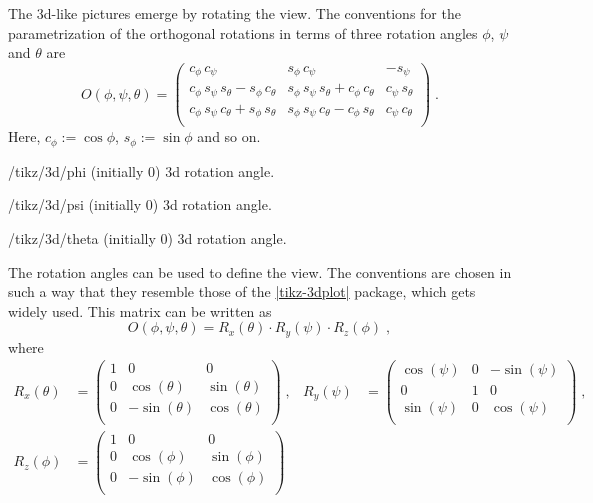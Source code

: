 \documentclass[a4paper,fleqn]{ltxdoc}
\begin{document}
The 3d-like pictures emerge by rotating the view. The conventions for the
parametrization of the orthogonal rotations in terms of three rotation angles
$\phi$, $\psi$ and $\theta$ are
\begin{equation}
 O(\phi,\psi,\theta)=\begin{pmatrix}
 c_{\phi}\,c_{\psi} & s_{\phi}\,c_{\psi} & -s_{\psi} \\
 c_{\phi}\,s_{\psi}\,s_{\theta}-s_{\phi}\,c_{\theta} & 
 s_{\phi}\,s_{\psi}\,s_{\theta}+c_{\phi}\,c_{\theta} 
 & c_{\psi}\,s_{\theta} \\
 c_{\phi}\,s_{\psi}\,c_{\theta}+s_{\phi}\,s_{\theta} 
 & s_{\phi}\,s_{\psi}\,c_{\theta}-c_{\phi}\,s_{\theta} & c_{\psi}\,c_{\theta} \\
\end{pmatrix}\;.\label{eq:O3}
\end{equation}
Here, $c_\phi:=\cos\phi$, $s_\phi:=\sin\phi$ and so on.
\begin{key}{/tikz/3d/phi (initially 0)}
        3d rotation angle.
\end{key}
\begin{key}{/tikz/3d/psi (initially 0)}
        3d rotation angle.
\end{key}
\begin{key}{/tikz/3d/theta (initially 0)}
        3d rotation angle.
\end{key}
The rotation angles can be used to define the view. The conventions are chosen
in such a way that they resemble those of the
\href{https://ctan.org/pkg/tikz-3dplot?lang=en}{|tikz-3dplot|} package, which
gets widely used. This matrix can be written as 
\[O(\phi,\psi,\theta)=R_x(\theta)\cdot R_y(\psi)\cdot R_z(\phi)\;,\]
where 
\begin{align*}
 R_x(\theta)&=
 \begin{pmatrix}
  1 & 0 & 0 \\
  0 & \cos (\theta ) & \sin (\theta ) \\
  0 & -\sin (\theta ) & \cos (\theta ) \\
 \end{pmatrix}\;,&
 R_y(\psi)&=
 \begin{pmatrix}
  \cos (\psi ) & 0 & -\sin (\psi ) \\
  0 & 1 & 0 \\
  \sin (\psi ) & 0 & \cos (\psi ) \\
 \end{pmatrix}\;,\\
 R_z(\phi)&=
 \begin{pmatrix}
  1 & 0 & 0 \\
  0 & \cos (\phi ) & \sin (\phi ) \\
  0 & -\sin (\phi ) & \cos (\phi ) \\
 \end{pmatrix}
\end{align*}
\end{document}
